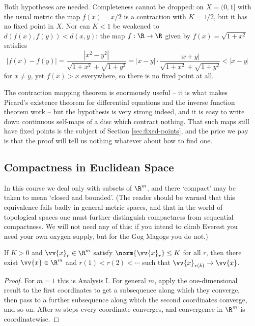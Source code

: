 Both hypotheses are needed. Completeness cannot be dropped: on $X = (0,1]$ with the usual metric the map $f(x) = x/2$ is a contraction with $K=1/2$, but it has no fixed point in $X$. Nor can $K<1$ be weakened to $d(f(x),f(y))<d(x,y)$: the map $f : \R\to\R$ given by $f(x) = \sqrt{1+x^2}$ satisfies
$$|f(x)-f(y)| = \frac{|x^2-y^2|}{\sqrt{1+x^2}+\sqrt{1+y^2}} = |x-y|\cdot\frac{|x+y|}{\sqrt{1+x^2}+\sqrt{1+y^2}} < |x-y|$$
for $x \neq y$, yet $f(x)>x$ everywhere, so there is no fixed point at all.

The contraction mapping theorem is enormously useful -- it is what makes Picard's existence theorem for differential equations and the inverse function theorem work -- but the hypothesis is very strong indeed, and it is easy to write down continuous self-maps of a disc which contract nothing. That such maps still have fixed points is the subject of Section \ref{sec:fixed-points}, and the price we pay is that the proof will tell us nothing whatever about how to find one.

\subsection{Compactness in Euclidean Space}

In this course we deal only with subsets of $\R^m$, and there `compact' may be taken to mean `closed and bounded'. (The reader should be warned that this equivalence fails badly in general metric spaces, and that in the world of topological spaces one must further distinguish compactness from sequential compactness. We will not need any of this: if you intend to climb Everest you need your own oxygen supply, but for the Gog Magogs you do not.)

\begin{theorem}
	If $K > 0$ and $\vv{x}_r \in \R^m$ satisfy $\norm{\vv{x}_r} \leq K$ for all $r$, then there exist $\vv{x} \in \R^m$ and $r(1) < r(2) < \cdots$ such that $\vv{x}_{r(k)} \to \vv{x}$.
\end{theorem}

\begin{proof}
	For $m=1$ this is Analysis I. For general $m$, apply the one-dimensional result to the first coordinates to get a subsequence along which they converge, then pass to a further subsequence along which the second coordinates converge, and so on. After $m$ steps every coordinate converges, and convergence in $\R^m$ is coordinatewise.
\end{proof}


